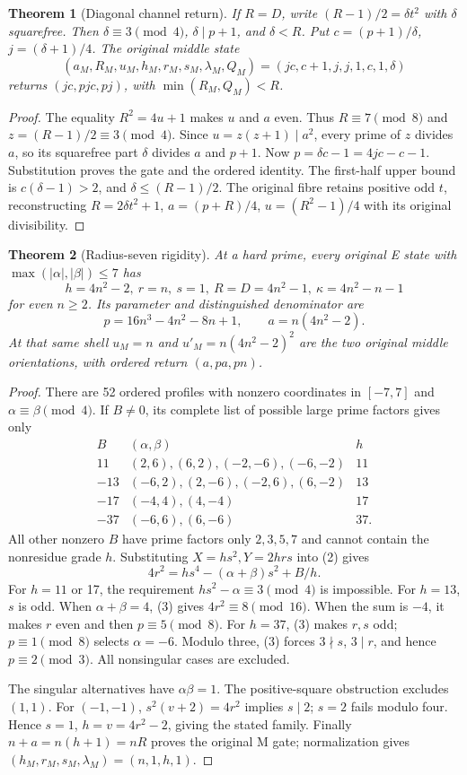 \documentclass[11pt,reqno]{amsart}
\newtheorem{theorem}{Theorem}\newtheorem{lemma}[theorem]{Lemma}
\begin{document}
\begin{theorem}[Diagonal channel return]
If $R=D$, write $(R-1)/2=\delta t^2$ with $\delta$ squarefree. Then
$\delta\equiv3\pmod4$, $\delta\mid p+1$, and $\delta<R$.
Put $c=(p+1)/\delta$, $j=(\delta+1)/4$. The original middle state
\[
 (a_M,R_M,u_M,h_M,r_M,s_M,\lambda_M,Q_M)
 =(jc,c+1,j,j,1,c,1,\delta)
\]
returns $(jc,pjc,pj)$, with $\min(R_M,Q_M)<R$.
\end{theorem}
\begin{proof}
The equality $R^2=4u+1$ makes $u$ and $a$ even. Thus $R\equiv7\pmod8$ and
$z=(R-1)/2\equiv3\pmod4$. Since $u=z(z+1)\mid a^2$, every prime of $z$
divides $a$, so its squarefree part $\delta$ divides $a$ and $p+1$.
Now $p=\delta c-1=4jc-c-1$. Substitution proves the gate and the ordered identity.
The first-half upper bound is $c(\delta-1)>2$, and $\delta\le(R-1)/2$.
The original fibre retains positive odd $t$, reconstructing
$R=2\delta t^2+1$, $a=(p+R)/4$, $u=(R^2-1)/4$ with its original divisibility.
\end{proof}

\begin{theorem}[Radius-seven rigidity]
At a hard prime, every original E state with $\max(|\alpha|,|\beta|)\le7$ has
\[
 h=4n^2-2,\ r=n,\ s=1,\ R=D=4n^2-1,\ \kappa=4n^2-n-1
\]
for even $n\ge2$. Its parameter and distinguished denominator are
\[
 p=16n^3-4n^2-8n+1,\qquad a=n(4n^2-2).
\]
At that same shell $u_M=n$ and $u'_M=n(4n^2-2)^2$ are the two original
middle orientations, with ordered return $(a,pa,pn)$.
\end{theorem}
\begin{proof}
There are 52 ordered profiles with nonzero coordinates in $[-7,7]$ and
$\alpha\equiv\beta\pmod4$. If $B\ne0$, its complete list of possible large
prime factors gives only
\[
\begin{array}{c|c|c}
B& (\alpha,\beta)&h\\\hline
11&(2,6),(6,2),(-2,-6),(-6,-2)&11\\
-13&(-6,2),(2,-6),(-2,6),(6,-2)&13\\
-17&(-4,4),(4,-4)&17\\
-37&(-6,6),(6,-6)&37.
\end{array}
\]
All other nonzero $B$ have prime factors only $2,3,5,7$ and cannot contain the
nonresidue grade $h$. Substituting $X=hs^2,Y=2hrs$ into (2) gives
\[
 4r^2=hs^4-(\alpha+\beta)s^2+B/h.                         \tag{3}
\]
For $h=11$ or 17, the requirement $hs^2-\alpha\equiv3\pmod4$ is impossible.
For $h=13$, $s$ is odd. When $\alpha+\beta=4$, (3) gives $4r^2\equiv8\pmod{16}$.
When the sum is $-4$, it makes $r$ even and then $p\equiv5\pmod8$.
For $h=37$, (3) makes $r,s$ odd; $p\equiv1\pmod8$ selects $\alpha=-6$.
Modulo three, (3) forces $3\nmid s$, $3\mid r$, and hence $p\equiv2\pmod3$.
All nonsingular cases are excluded.

The singular alternatives have $\alpha\beta=1$. The positive-square obstruction
excludes $(1,1)$. For $(-1,-1)$, $s^2(v+2)=4r^2$ implies $s\mid2$;
$s=2$ fails modulo four. Hence $s=1$, $h=v=4r^2-2$, giving the stated family.
Finally $n+a=n(h+1)=nR$ proves the original M gate; normalization gives
$(h_M,r_M,s_M,\lambda_M)=(n,1,h,1)$.
\end{proof}
\end{document}
